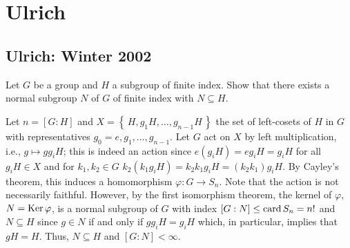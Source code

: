 \section{Ulrich}
\subsection{Ulrich: Winter 2002}
\setcounter{exercise}{0}
\setcounter{equation}{0}

\begin{problem}
  Let \(G\) be a group and \(H\) a subgroup of finite index. Show that
  there exists a normal subgroup \(N\) of \(G\) of finite index with
  \(N\subseteq H\).
\end{problem}
\begin{solution}
  Let \(n=[G:H]\) and \(X=\left\{\,H,g_1H,\dotsc,g_{n-1}H\,\right\}\) the
  set of left-cosets of \(H\) in \(G\) with representatives
  \(g_0=e,g_1,\dotsc,g_{n-1}\). Let \(G\) act on \(X\) by left
  multiplication, i.e., \(g\mapsto g g_iH\); this is indeed an action since
  \(e(g_iH)=eg_iH=g_iH\) for all \(g_iH\in X\) and for \(k_1,k_2\in G\)
  \(k_2(k_1g_iH)=k_2k_1g_iH=(k_2k_1)g_iH\). By Cayley's theorem, this
  induces a homomorphism \(\varphi\colon G\to S_n\). Note that the action
  is not necessarily faithful. However, by the first isomorphism theorem,
  the kernel of \(\varphi\), \(N=\operatorname{Ker}\varphi\), is a normal subgroup of
  \(G\) with index \([G:N]\leq \operatorname{card} S_n=n!\) and \(N\subseteq H\) since
  \(g\in N\) if and only if \(gg_iH=g_iH\) which, in particular, implies
  that \(gH=H\). Thus, \(N\subseteq H\) and \([G:N]<\infty\).
\end{solution}

